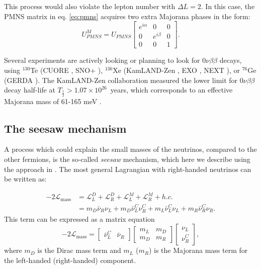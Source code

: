 This process would also violate the lepton number with $\Delta L = 2$. In this case, the PMNS matrix in eq. \eqref{eq:pmns} acquires two extra Majorana phases in the form:
\begin{equation}
    U_{PMNS}^M = U_{PMNS} \begin{bmatrix}
    e^{i\alpha} & 0 & 0 \\
    0 & e^{i\beta} & 0 \\
    0 & 0 & 1
    \end{bmatrix}.
\end{equation}

Several experiments are actively looking or planning to look for $0\nu\beta\beta$ decays, using $^{130}$Te (CUORE \cite{Arnaboldi:2002du}, SNO+ \cite{Andringa:2015tza}), $^{136}$Xe (KamLAND-Zen \cite{KamLAND-Zen:2016pfg}, EXO \cite{Auger:2012ar}, NEXT \cite{Alvarez:2012flf}), or $^{76}$Ge (GERDA \cite{Agostini:2013mzu}). 
The KamLAND-Zen collaboration measured the lower limit for $0\nu\beta\beta$ decay half-life at $T_{\frac{1}{2}} > 1.07\times10^{26}$~years, which corresponds to an effective Majorana mass of 61-165 meV \cite{KamLAND-Zen:2016pfg}.

\subsection{The seesaw mechanism}\label{sec:seesaw}
A process which could explain the small masses of the neutrinos, compared to the other fermions, is the so-called \emph{seesaw} mechanism, which here we describe using the approach in \cite{Grossman:2003eb}. 
The most general Lagrangian with right-handed neutrinos can be written as:

\begin{align}
    -2\mathcal{L}_{\mathrm{mass}} & = \mathcal{L}^D_L + \mathcal{L}^D_R + \mathcal{L}^M_L + \mathcal{L}^M_R + h.c. \\
    & = m_D \bar{\nu}_R \nu_L + m_D \bar{\nu}^C_L\nu^C_R + m_L\bar{\nu}_L^C\nu_L + m_R \bar{\nu}_R^C\nu_R.
\end{align}
This term can be expressed as a matrix equation 
\begin{equation}
    -2\mathcal{L_\mathrm{mass}} = \begin{bmatrix}
    \bar{\nu}_L^C & \bar{\nu}_R
    \end{bmatrix}\begin{bmatrix}
    m_L & m_D \\
    m_D & m_R
    \end{bmatrix}\begin{bmatrix}
    \nu_L \\ \nu_R^C
    \end{bmatrix},
\end{equation}
where $m_D$ is the Dirac mass term and $m_L$ ($m_R$) is the Majorana mass term for the left-handed (right-handed) component. 

